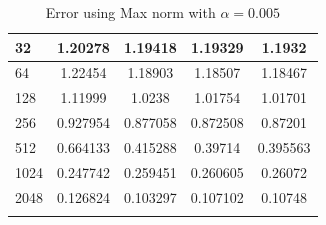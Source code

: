 \begin{table}[H]
\begin{tabular}{lcccc}
		\midrule
		\hspace{7mm} 32 & 1.20278  & 1.19418   & 1.19329   & 1.1932   \\
		\midrule
		\hspace{7mm} 64 & 1.22454  & 1.18903   & 1.18507   & 1.18467  \\
		\midrule
		\hspace{7mm} 128 & 1.11999  & 1.0238    & 1.01754   & 1.01701  \\
		\midrule
		\hspace{7mm} 256 & 0.927954 & 0.877058  & 0.872508  & 0.87201  \\
		\midrule
		\hspace{7mm} 512 & 0.664133 & 0.415288  & 0.39714   & 0.395563 \\
		\midrule
		\hspace{7mm} 1024 & 0.247742 & 0.259451  & 0.260605  & 0.26072  \\
		\midrule
		\hspace{7mm} 2048 & 0.126824 & 0.103297  & 0.107102  & 0.10748  \\
		\\
		\bottomrule
	\end{tabular}
	\caption{Error using Max norm with $\alpha=0.005$}
	\label{Collocation_tabla_max_alpha=005}
	\end{table}